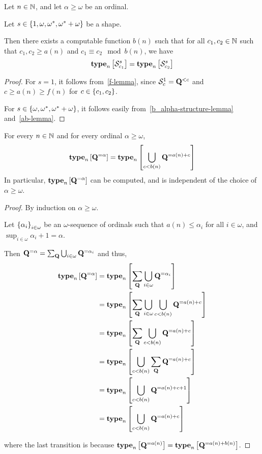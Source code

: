 \begin{corollary}\label{s-alpha-finite}
    Let $n \in \mathbb{N}$, and let $\alpha \ge \omega$ be an ordinal.

    Let $s \in \left\{ {1, \omega, \omega^\ast, \omega^\ast + \omega} \right\}$ be a shape.

    Then there exists a computable function $b(n)$ such that
    for all $c_1, c_2 \in \mathbb{N}$ such that $c_1, c_2 \ge a(n)$ and $c_1 \equiv c_2 \mod b(n)$,
    we have
    \[\mathbf{type}_{n} \left[ {\mathcal{S}^{s}_{c_1}} \right] = \mathbf{type}_{n} \left[ {\mathcal{S}^{s}_{c_2}} \right]\]
\end{corollary}

\begin{proof}
    For $s = 1$, it follows from~\cref{f-lemma},
    since $\mathcal{S}^{1}_{c} = \mathbf{Q}^{< c}$
    and $c \ge a(n) \ge f(n)$ for $c \in \left\{ {c_1, c_2} \right\}$.

    For $s \in \left\{ {\omega, \omega^\ast, \omega^\ast + \omega} \right\}$, it follows easily from~\cref{b_alpha-structure-lemma}
    and~\cref{ab-lemma}.
\end{proof}

\begin{lemma}
    For every $n \in \mathbb{N}$ and for every ordinal $\alpha \ge \omega$,
    \[
        \mathbf{type}_{n} \left[ {\mathbf{Q}^{= \alpha}} \right] = \mathbf{type}_{n} \left[ {\bigcup_{c < b(n)}{\mathbf{Q}^{= a(n) + c}}} \right]
    \]
    In particular, $\mathbf{type}_{n} \left[ {\mathbf{Q}^{= \alpha}} \right]$ can be computed,
    and is independent of the choice of $\alpha \ge \omega$.
\end{lemma}

\begin{proof}
    By induction on $\alpha \ge \omega$.

    Let $\left\{ {\alpha_i} \right\}_{i \in \omega}$ be an $\omega$-sequence of ordinals
    such that $a(n) \le \alpha_i$ for all $i \in \omega$,
    and $\sup_{i \in \omega} {\alpha_i + 1} = \alpha$.

    Then $\mathbf{Q}^{= \alpha} = \sum_{\mathbf{Q}}{\bigcup_{i \in \omega} \mathbf{Q}^{= \alpha_i}}$ and thus,
    \begin{align*}
        \mathbf{type}_{n} \left[ {\mathbf{Q}^{= \alpha}} \right]
        &= \mathbf{type}_{n} \left[ {\sum_{\mathbf{Q}} \bigcup_{i \in \omega} \mathbf{Q}^{= \alpha_i}} \right] \\
        &= \mathbf{type}_{n} \left[ {\sum_{\mathbf{Q}} \bigcup_{i \in \omega} \bigcup_{c < b(n)}{\mathbf{Q}^{= a(n) + c}}} \right] \\
        &= \mathbf{type}_{n} \left[ {\sum_{\mathbf{Q}} \bigcup_{c < b(n)}{\mathbf{Q}^{= a(n) + c}}} \right] \\
        &= \mathbf{type}_{n} \left[ {\bigcup_{c < b(n)}{\sum_{\mathbf{Q}} \mathbf{Q}^{= a(n) + c}}} \right] \\
        &= \mathbf{type}_{n} \left[ {\bigcup_{c < b(n)}{\mathbf{Q}^{= a(n) + c + 1}}} \right] \\
        &= \mathbf{type}_{n} \left[ {\bigcup_{c < b(n)}{\mathbf{Q}^{= a(n) + c}}} \right]
    \end{align*}

    where the last transition is because $\mathbf{type}_{n} \left[ {\mathbf{Q}^{= a(n)}} \right] = \mathbf{type}_{n} \left[ {\mathbf{Q}^{= a(n) + b(n)}} \right]$.
\end{proof}

